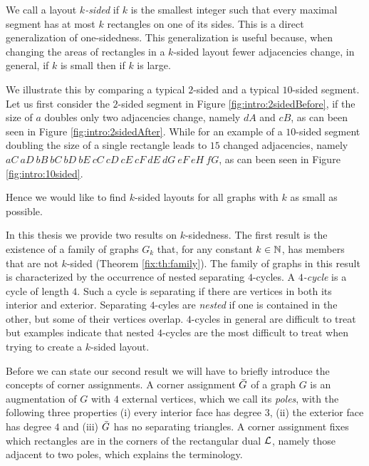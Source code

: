   We call a layout \emph{$k$-sided} if $k$ is the smallest integer such that every maximal segment has at most $k$ rectangles on one of its sides. This is a direct generalization of one-sidedness.
  This generalization is useful because, when changing the areas of rectangles in a $k$-sided layout fewer adjacencies change, in general, if $k$ is small then if $k$ is large.

  We illustrate this by comparing a typical $2$-sided and a typical $10$-sided segment.
  Let us first consider the $2$-sided segment in Figure \ref{fig:intro:2sidedBefore}, if the size of $a$ doubles only two adjacencies change, namely $dA$ and $cB$, as can been seen in Figure \ref{fig:intro:2sidedAfter}.
  While for an example of a $10$-sided segment doubling the size of a single rectangle leads to $15$ changed adjacencies, namely $aC\ aD\ bB\ bC\ bD\ bE\ cC\ cD\ cE\ cF\ dE\ dG\ eF\ eH\ fG$, as can been seen in Figure \ref{fig:intro:10sided}.

  Hence we would like to find $k$-sided layouts for all graphs with $k$ as small as possible.


  In this thesis we provide two results on $k$-sidedness. The first result is the existence of a family of graphs $G_k$ that, for any constant $k \in \mathbb{N}$, has members that are not $k$-sided (Theorem \ref{fix:th:family}). The family of graphs in this result is characterized by the occurrence of nested separating $4$-cycles.
  A \emph{$4$-cycle} is a cycle of length $4$.
  Such a cycle is separating if there are vertices in both its interior and exterior.
  Separating $4$-cyles are \emph{nested} if one is contained in the other, but some of their vertices overlap.
  $4$-cycles in general are difficult to treat but examples indicate that nested $4$-cycles are the most difficult to treat when trying to create a $k$-sided layout.



  Before we can state our second result we will have to briefly introduce the concepts of corner assignments.
  A corner assignment $\bar{G}$ of a graph $G$ is an augmentation of $G$ with $4$ external vertices, which we call its \emph{poles}, with the following three properties (i) every interior face has degree $3$, (ii) the exterior face has degree $4$ and (iii) $\bar{G}$ has no separating triangles.
  A corner assignment fixes which rectangles are in the corners of the rectangular dual $\mathcal{L}$, namely those adjacent to two poles, which explains the terminology.

